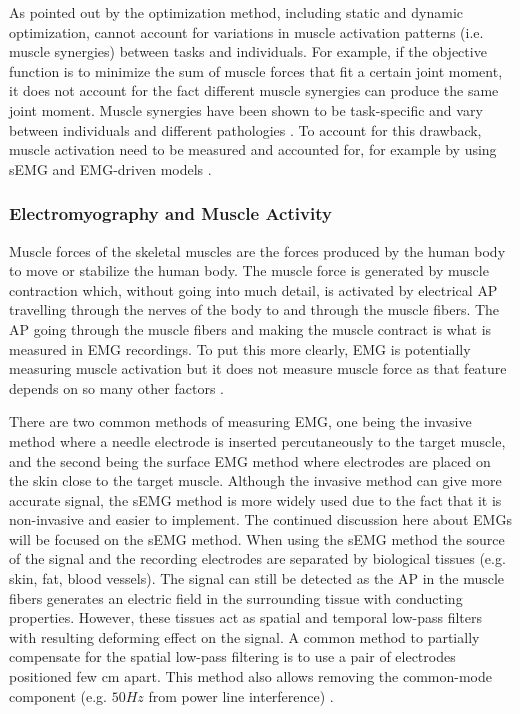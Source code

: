 As pointed out by  the optimization method, including static and dynamic optimization, cannot account for variations in muscle activation patterns (i.e. muscle synergies) between tasks and individuals.
For example, if the objective function is to minimize the sum of muscle forces that fit a certain joint moment, it does not account for the fact different muscle synergies can produce the same joint moment. 
Muscle synergies have been shown to be task-specific and vary between individuals and different pathologies \cite{Ivanenko2016, Safavynia2011}.
To account for this drawback, muscle activation need to be measured and accounted for, for example by using \ac{sEMG} and \ac{EMG}-driven models \cite{Pizzolato2015}.

\subsubsection{Electromyography and Muscle Activity}
\label{sec:A-EMG}
Muscle forces of the skeletal muscles are the forces produced by the human body to move or stabilize the human body. 
The muscle force is generated by muscle contraction which, without going into much detail, is activated by electrical \ac{AP} travelling through the nerves of the body to and through the muscle fibers. 
The \ac{AP} going through the muscle fibers and making the muscle contract is what is measured in \ac{EMG} recordings.
To put this more clearly, \ac{EMG} is potentially measuring muscle activation but it does not measure muscle force as that feature depends on so many other factors \cite{Enoka2016}.

There are two common methods of measuring \ac{EMG}, one being the invasive method where a needle electrode is inserted percutaneously to the target muscle, and the second being the surface \ac{EMG} method where electrodes are placed on the skin close to the target muscle. 
Although the invasive method can give more accurate signal, the \ac{sEMG} method is more widely used due to the fact that it is non-invasive and easier to implement. 
The continued discussion here about \ac{EMG}s will be focused on the \ac{sEMG} method.
When using the \ac{sEMG} method the source of the signal and the recording electrodes are separated by biological tissues (e.g. skin, fat, blood vessels).
The signal can still be detected as the \ac{AP} in the muscle fibers generates an electric field in the surrounding tissue with conducting properties.
However, these tissues act as spatial and temporal low-pass filters with resulting deforming effect on the signal.
A common method to partially compensate for the spatial low-pass filtering is to use a pair of electrodes positioned few cm apart.
This method also allows removing the common-mode component (e.g. $50Hz$ from power line interference) \cite{Farina2016}.

